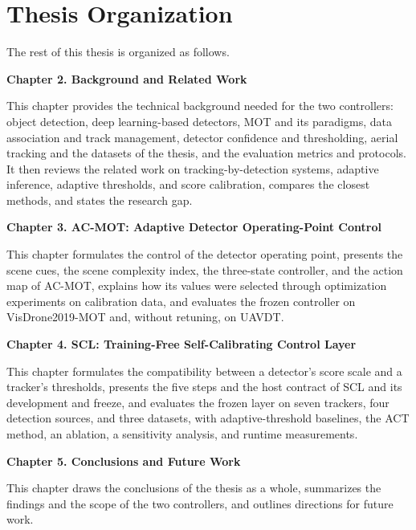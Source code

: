 \section{Thesis Organization}\label{sec:intro-organization}
The rest of this thesis is organized as follows.

\textbf{Chapter 2. Background and Related Work}

This chapter provides the technical background needed for the two controllers: object detection, deep learning-based detectors, MOT and its paradigms, data association and track management, detector confidence and thresholding, aerial tracking and the datasets of the thesis, and the evaluation metrics and protocols. It then reviews the related work on tracking-by-detection systems, adaptive inference, adaptive thresholds, and score calibration, compares the closest methods, and states the research gap.

\textbf{Chapter 3. AC-MOT: Adaptive Detector Operating-Point Control}

This chapter formulates the control of the detector operating point, presents the scene cues, the scene complexity index, the three-state controller, and the action map of AC-MOT, explains how its values were selected through optimization experiments on calibration data, and evaluates the frozen controller on VisDrone2019-MOT and, without retuning, on UAVDT.

\textbf{Chapter 4. SCL: Training-Free Self-Calibrating Control Layer}

This chapter formulates the compatibility between a detector's score scale and a tracker's thresholds, presents the five steps and the host contract of SCL and its development and freeze, and evaluates the frozen layer on seven trackers, four detection sources, and three datasets, with adaptive-threshold baselines, the ACT method, an ablation, a sensitivity analysis, and runtime measurements.

\textbf{Chapter 5. Conclusions and Future Work}

This chapter draws the conclusions of the thesis as a whole, summarizes the findings and the scope of the two controllers, and outlines directions for future work.

